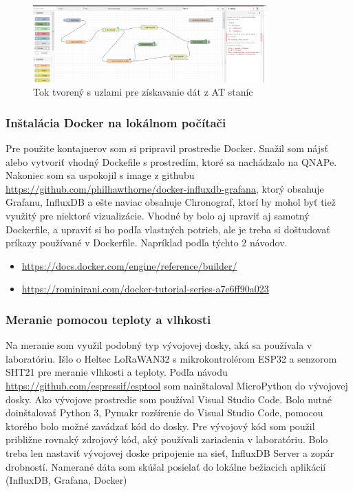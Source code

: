 \begin{figure}[h!]
    \centering
    \includegraphics[width=0.8\textwidth]{images/node_red_at.png}
    \caption{Tok tvorený s uzlami pre získavanie dát z AT staníc}
    \label{fig:node_red_at}
\end{figure}

\subsubsection{Inštalácia Docker na lokálnom počítači}
Pre použite kontajnerov som si pripravil prostredie Docker. Snažil som nájsť alebo vytvoriť vhodný Dockefile s prostredím, ktoré sa nachádzalo na QNAPe. Nakoniec som sa uspokojil s image z githubu \url{https://github.com/philhawthorne/docker-influxdb-grafana}, ktorý obsahuje Grafanu, InfluxDB a ešte naviac obsahuje Chronograf, ktorí by mohol byť tiež využitý pre niektoré vizualizácie. Vhodné by bolo aj upraviť aj samotný Dockerfile, a upraviť si ho podľa vlastných potrieb, ale je treba si doštudovať príkazy používané v Dockerfile. Napríklad podľa týchto 2 návodov.
\begin{itemize}
    \item \url{https://docs.docker.com/engine/reference/builder/}
    \item \url{https://rominirani.com/docker-tutorial-series-a7e6ff90a023}
\end{itemize}

\subsubsection{Meranie pomocou teploty a vlhkosti}
Na meranie som využil podobný typ vývojovej dosky, aká sa používala v laboratóriu. Išlo o Heltec LoRaWAN32 s mikrokontrolérom ESP32 a senzorom SHT21 pre meranie vlhkosti a teploty. Podľa návodu \url{https://github.com/espressif/esptool} som nainštaloval MicroPython do vývojovej dosky. Ako vývojove prostredie som používal Visual Studio Code. Bolo nutné doinštalovať Python 3, Pymakr rozšírenie do Visual Studio Code, pomocou ktorého bolo možné zavádzať kód do dosky. Pre vývojový kód som použil približne rovnaký zdrojový kód, aký používali zariadenia v laboratóriu. Bolo treba len nastaviť vývojovej doske pripojenie na sieť, InfluxDB Server a zopár drobností.
Namerané dáta som skúšal posielať do lokálne bežiacich aplikácií (InfluxDB, Grafana, Docker)


